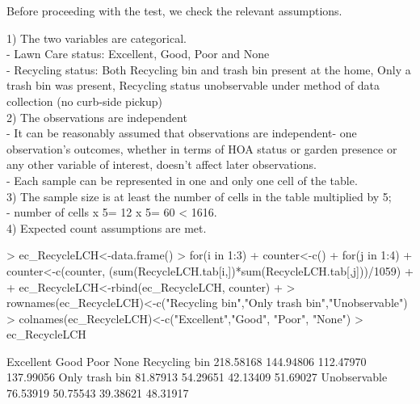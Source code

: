 \documentclass{article}
\begin{document}
Before proceeding with the test, we check the relevant assumptions.

1) The two variables are categorical.\\
- Lawn Care status: Excellent, Good, Poor and None\\
- Recycling status: Both Recycling bin and trash bin present at the home, Only a trash bin was present, Recycling status unobservable under method of data collection (no curb-side pickup)\\

2) The observations are independent\\
- It can be reasonably assumed that observations are independent- one observation's outcomes, whether in terms of HOA status or garden presence or any other variable of interest, doesn't affect later observations.\\
- Each sample can be represented in one and only one cell of the table.\\

3) The sample size is at least the number of cells in the table multiplied by 5;\\
- number of cells x 5= 12 x 5= 60 < 1616.\\

4) Expected count assumptions are met.

\begin{Schunk}
\begin{Sinput}
> ec_RecycleLCH<-data.frame()
> for(i in 1:3){
+   counter<-c()
+   for(j in 1:4){
+     counter<-c(counter, (sum(RecycleLCH.tab[i,])*sum(RecycleLCH.tab[,j]))/1059)
+   }
+   ec_RecycleLCH<-rbind(ec_RecycleLCH, counter)
+ }
> rownames(ec_RecycleLCH)<-c("Recycling bin","Only trash bin","Unobservable")
> colnames(ec_RecycleLCH)<-c("Excellent","Good", "Poor", "None")
> ec_RecycleLCH
\end{Sinput}
\begin{Soutput}
               Excellent      Good      Poor      None
Recycling bin  218.58168 144.94806 112.47970 137.99056
Only trash bin  81.87913  54.29651  42.13409  51.69027
Unobservable    76.53919  50.75543  39.38621  48.31917
\end{Soutput}
\end{Schunk}
\end{document}
